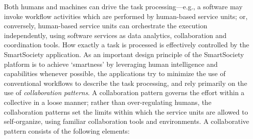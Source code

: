       Both humans and machines can drive the task processing---e.g., a software may invoke workflow activities which are performed by  human-based service units; or, conversely, human-based service units can orchestrate the execution independently, using software services as data analytics, collaboration and coordination tools.
      How exactly a task is processed is effectively controlled by the SmartSociety application.  As an important design principle of the SmartSociety platform is to achieve `smartness' by leveraging human intelligence and capabilities whenever possible, the applications try to minimize the use of conventional workflows to describe the task processing, and rely primarily on the use of \emph{collaboration patterns}. 
      A collaboration pattern governs the effort within a collective in a loose manner; rather than over-regulating humans, the collaboration patterns set the limits within which the service units are allowed to self-organize, using familiar collaboration tools and environments. 
      A collaborative pattern consists of the following elements:

